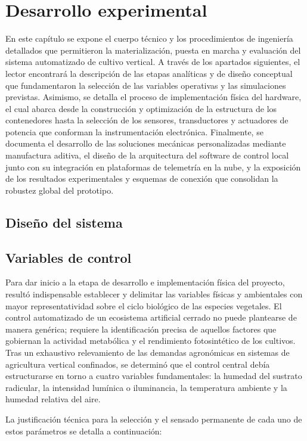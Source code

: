 \chapter{Desarrollo experimental}
En este capítulo se expone el cuerpo técnico y los procedimientos de ingeniería detallados que permitieron la materialización, puesta en marcha y evaluación del sistema automatizado de cultivo vertical. A través de los apartados siguientes, el lector encontrará la descripción de las etapas analíticas y de diseño conceptual que fundamentaron la selección de las variables operativas y las simulaciones previstas. Asimismo, se detalla el proceso de implementación física del hardware, el cual abarca desde la construcción y optimización de la estructura de los contenedores hasta la selección de los sensores, transductores y actuadores de potencia que conforman la instrumentación electrónica. Finalmente, se documenta el desarrollo de las soluciones mecánicas personalizadas mediante manufactura aditiva, el diseño de la arquitectura del software de control local junto con su integración en plataformas de telemetría en la nube, y la exposición de los resultados experimentales y esquemas de conexión que consolidan la robustez global del prototipo.

\section{Diseño del sistema}


\section{Variables de control}
Para dar inicio a la etapa de desarrollo e implementación física del proyecto, resultó indispensable establecer y delimitar las variables físicas y ambientales con mayor representatividad sobre el ciclo biológico de las especies vegetales. El control automatizado de un ecosistema artificial cerrado no puede plantearse de manera genérica; requiere la identificación precisa de aquellos factores que gobiernan la actividad metabólica y el rendimiento fotosintético de los cultivos. Tras un exhaustivo relevamiento de las demandas agronómicas en sistemas de agricultura vertical confinados, se determinó que el control central debía estructurarse en torno a cuatro variables fundamentales: la humedad del sustrato radicular, la intensidad lumínica o iluminancia, la temperatura ambiente y la humedad relativa del aire.

La justificación técnica para la selección y el sensado permanente de cada uno de estos parámetros se detalla a continuación:


